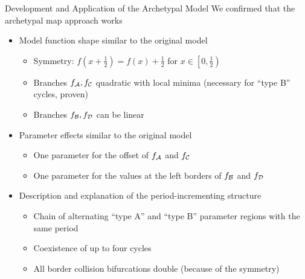 \begin{frame}{Development and Application of the Archetypal Model}
	\vspace{-1em}
	We confirmed that the archetypal map approach works
	\vspace{1em}
	\pause
	\begin{itemize}
		\item Model function shape similar to the original model
		      \begin{itemize}
			      \item Symmetry: $f\left(x + \frac{1}{2}\right) = f(x) + \frac{1}{2}$ for $x \in \left[0, \frac{1}{2}\right)$
			      \item Branches $f_{\mathcal{A}}, f_{\mathcal{C}}$ quadratic with local minima (necessary for ``type B'' cycles, proven)
			      \item Branches $f_{\mathcal{B}}, f_{\mathcal{D}}$ can be linear
		      \end{itemize}
		      \pause
		\item Parameter effects similar to the original model
		      \begin{itemize}
			      \item One parameter for the offset of $f_{\mathcal{A}}$ and $f_{\mathcal{C}}$
			      \item One parameter for the values at the left borders of $f_{\mathcal{B}}$ and $f_{\mathcal{D}}$
		      \end{itemize}
		      \pause
		\item Description and explanation of the period-incrementing structure
		      \begin{itemize}
			      \item Chain of alternating ``type A'' and ``type B'' parameter regions with the same period
			      \item Coexistence of up to four cycles
			      \item All border collision bifurcations double (because of the symmetry)
		      \end{itemize}
	\end{itemize}
\end{frame}
